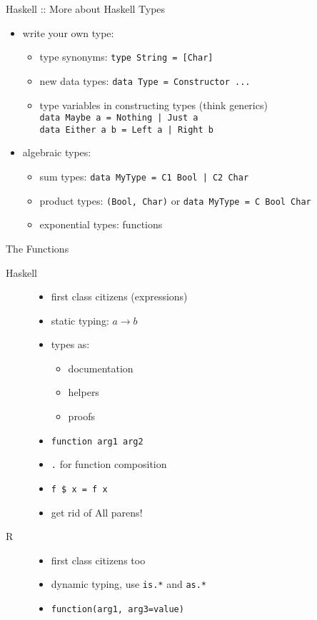 \documentclass{beamer}
\begin{document}
\begin{frame}{Haskell :: More about Haskell Types}
  \begin{itemize}
    \item write your own type:
      \begin{itemize}
        \item type synonyms: \texttt{type String = [Char]}
        \item new data types: \texttt{data Type = Constructor ...}
        \item type variables in constructing types (think generics)\\
          \texttt{data Maybe a = Nothing | Just a}\\
          \texttt{data Either a b = Left a | Right b}
      \end{itemize}
    \item algebraic types:
      \begin{itemize}
        \item sum types: \texttt{data MyType = C1 Bool | C2 Char}
        \item product types: \texttt{(Bool, Char)} or \texttt{data MyType = C Bool Char}
        \item exponential types: functions
      \end{itemize}
  \end{itemize}
\end{frame}

\begin{frame}{The Functions}
  \begin{description}
    \item[Haskell]
      \begin{itemize}
        \item first class citizens (expressions)
        \item static typing: $a \rightarrow b$
        \item types as:
          \begin{itemize}
            \item documentation
            \item helpers
            \item proofs
          \end{itemize}
        \item \texttt{function arg1 arg2}
        \item \texttt{.} for function composition
        \item \texttt{f \$ x = f x}
        \item get rid of All parens!
      \end{itemize}
    \item[R]
      \begin{itemize}
        \item first class citizens too
        \item dynamic typing, use \texttt{is.*} and \texttt{as.*}
        \item \texttt{function(arg1, arg3=value)}
      \end{itemize}
  \end{description}
\end{frame}
\end{document}
